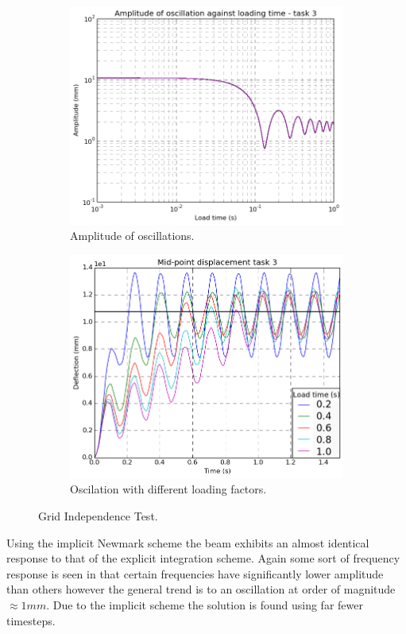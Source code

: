 \documentclass[10pt, a4paper]{article}
\begin{document}
\begin{figure}[!htb]
\centering
\begin{subfigure}{.5\textwidth}
  \centering
  \includegraphics[width=1\linewidth]{task3_amplitude}
  \caption{Amplitude of oscillations.}
  \label{fig:amplitude3}
\end{subfigure}%
\begin{subfigure}{.5\textwidth}
  \centering
  \includegraphics[width=1\linewidth]{task3_deflection}
  \caption{Oscilation with different loading factors.}
  \label{fig:deflection3}
\end{subfigure}
\caption{Grid Independence Test.}
\label{fig:task3}
\end{figure}
\noindent
Using the implicit Newmark scheme the beam exhibits an almost identical response to that of the explicit integration scheme. Again some sort of frequency response is seen in that certain frequencies have significantly lower amplitude than others however the general trend is to an oscillation at order of magnitude $\approx 1mm$. Due to the implicit scheme the solution is found using far fewer timesteps.
\end{document}
